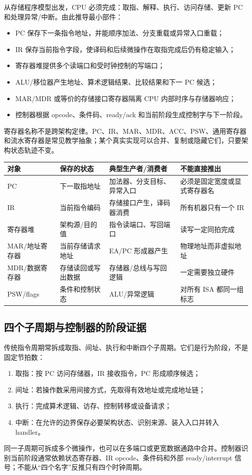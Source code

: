 \documentclass[UTF8,fontset=fandol,11pt,a4paper]{ctexart}
\begin{document}
从存储程序模型出发，CPU 必须完成：取指、解释、执行、访问存储、更新 PC 和处理异常/中断。由此推导最小部件：
\begin{itemize}
  \item PC 保存下一条指令地址，并能顺序加法、分支重载或异常入口重载；
  \item IR 保存当前指令字段，使译码和后续微操作在取指完成后仍有稳定输入；
  \item 寄存器堆提供多个读端口和受时钟控制的写端口；
  \item ALU/移位器产生地址、算术逻辑结果、比较结果和下一 PC 候选；
  \item MAR/MDR 或等价的存储接口寄存器隔离 CPU 内部时序与存储器响应；
  \item 控制器根据 opcode、条件码、ready/ack 和当前阶段生成控制字与下一阶段。
\end{itemize}
寄存器名称不是跨架构定律。PC、IR、MAR、MDR、ACC、PSW、通用寄存器和流水寄存器是常见教学抽象；某个真实实现可以合并、复制或隐藏它们，只要架构状态轨迹不变。

\begin{center}\small
\begin{tabularx}{\linewidth}{L{2.0cm}L{3.0cm}L{3.2cm}Y}
\toprule
对象 & 保存的状态 & 典型生产者/消费者 & 不能直接推出 \\
\midrule
PC & 下一取指地址 & 加法器、分支目标、异常入口 & 必须是固定宽度或显式寄存器名 \\
IR & 当前指令编码 & 存储接口产生，译码器消费 & 所有机器只有一个 IR \\
寄存器堆 & 架构源/目的值 & 指令读端口、写回端口 & 读写一定同拍完成 \\
MAR/地址寄存器 & 当前存储请求地址 & EA/PC 形成器产生 & 物理地址而非虚拟地址 \\
MDR/数据寄存器 & 存储读回或写出数据 & 存储器/总线与写回逻辑 & 一定需要独立硬件 \\
PSW/flags & 条件和控制状态 & ALU/异常逻辑 & 对所有 ISA 都同一组标志 \\
\bottomrule
\end{tabularx}
\end{center}

\subsection{四个子周期与控制器的阶段证据}

传统指令周期常拆成取指、间址、执行和中断四个子周期。它们是行为阶段，不是固定节拍数：
\begin{enumerate}
  \item 取指：按 PC 访问存储器，IR 接收指令，PC 形成顺序候选；
  \item 间址：若操作数采用间接方式，先取得有效地址或完成地址链；
  \item 执行：完成算术逻辑、访存、控制转移或设备请求；
  \item 中断：在允许的边界保存必要架构状态、识别来源、装入入口并转入 handler。
\end{enumerate}
同一子周期可拆成多个微操作，也可以在多端口或更宽数据通路中合并。控制器识别当前阶段通常依赖状态寄存器、IR opcode、条件码和外部 ready/interrupt 信号；不能从“四个名字”反推只有四个时钟周期。
\end{document}
